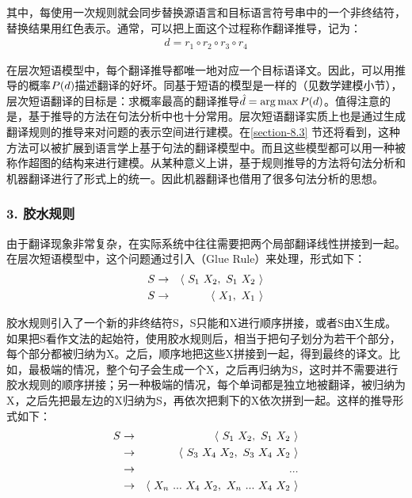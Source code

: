 \noindent 其中，每使用一次规则就会同步替换源语言和目标语言符号串中的一个非终结符，替换结果用红色表示。通常，可以把上面这个过程称作翻译推导，记为：
\begin{eqnarray}
d = {r_1} \circ {r_2} \circ {r_3} \circ {r_4}
\label{eq:8-1}
\end{eqnarray}

\parinterval 在层次短语模型中，每个翻译推导都唯一地对应一个目标语译文。因此，可以用推导的概率${P}(d)$描述翻译的好坏。同基于短语的模型是一样的（见{\chapterseven}数学建模小节），层次短语翻译的目标是：求概率最高的翻译推导$\hat{d}=\arg\max{P}(d)$。值得注意的是，基于推导的方法在句法分析中也十分常用。层次短语翻译实质上也是通过生成翻译规则的推导来对问题的表示空间进行建模。在\ref{section-8.3} 节还将看到，这种方法可以被扩展到语言学上基于句法的翻译模型中。而且这些模型都可以用一种被称作超图的结构来进行建模。从某种意义上讲，基于规则推导的方法将句法分析和机器翻译进行了形式上的统一。因此机器翻译也借用了很多句法分析的思想。


\subsubsection{3. 胶水规则}

\parinterval 由于翻译现象非常复杂，在实际系统中往往需要把两个局部翻译线性拼接到一起。在层次短语模型中，这个问题通过引入{\small{}}（Glue Rule）来处理，形式如下：
\begin{eqnarray}
\funp{S} & \to & \langle\ \funp{S}_1\ \funp{X}_2,\ \funp{S}_1\ \funp{X}_2\ \rangle \nonumber \\
\funp{S} & \to & \langle\ \funp{X}_1,\ \funp{X}_1\ \rangle \nonumber
\end{eqnarray}

\parinterval 胶水规则引入了一个新的非终结符S，S只能和X进行顺序拼接，或者S由X生成。如果把S看作文法的起始符，使用胶水规则后，相当于把句子划分为若干个部分，每个部分都被归纳为X。之后，顺序地把这些X拼接到一起，得到最终的译文。比如，最极端的情况，整个句子会生成一个X，之后再归纳为S，这时并不需要进行胶水规则的顺序拼接；另一种极端的情况，每个单词都是独立地被翻译，被归纳为X，之后先把最左边的X归纳为S，再依次把剩下的X依次拼到一起。这样的推导形式如下：
\begin{eqnarray}
\funp{S} & \to & \langle\ \funp{S}_1\ \funp{X}_2,\ \funp{S}_1\ \funp{X}_2\ \rangle \nonumber \\
                & \to & \langle\ \funp{S}_3\ \funp{X}_4\ \funp{X}_2,\ \funp{S}_3\ \funp{X}_4\ \funp{X}_2\ \rangle \nonumber \\
                & \to & ... \nonumber \\
                & \to & \langle\ \funp{X}_n\ ...\ \funp{X}_4\ \funp{X}_2,\ \funp{X}_n\ ...\ \funp{X}_4\ \funp{X}_2\ \rangle \nonumber
\end{eqnarray}

